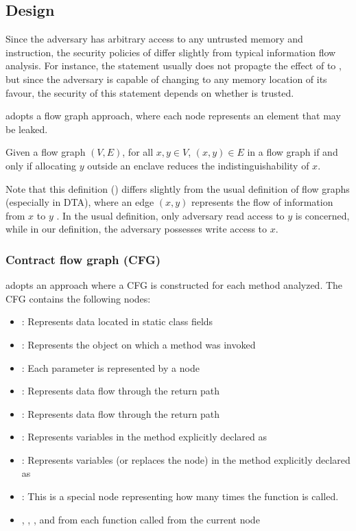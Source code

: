 \subsection{Design}
Since the adversary has arbitrary access to any untrusted memory and instruction,
the security policies of \pname{} differ slightly from typical information flow analysis.
For instance, the statement  usually
does not propagte the effect of  to ,
but since the adversary is capable of changing  to any memory location of its favour,
the security of this statement depends on whether  is trusted.

\pname{} adopts a flow graph approach,
where each node represents an element that may be leaked.

\begin{defin}
	Given a flow graph $(V, E)$, for all $x, y \in V$,
	$(x, y) \in E$ in a flow graph if and only if
	allocating $y$ outside an enclave reduces the indistinguishability of $x$.
\end{defin}

Note that this definition () differs slightly from
the usual definition of flow graphs (especially in DTA),
where an edge $(x, y)$ represents the flow of information from $x$ to $y$ \cite{YinHeng2007Pcsi}.
In the usual definition, only adversary read access to $y$ is concerned,
while in our definition, the adversary possesses write access to $x$.

\subsubsection{Contract flow graph (CFG)}
\pname{} adopts an approach where a CFG is constructed for each method analyzed.
The CFG contains the following nodes:
\begin{itemize}
	\item {}: Represents data located in static class fields
	\item {}: Represents the object on which a method was invoked
	\item {}: Each parameter is represented by a node
	\item {}: Represents data flow through the return path
	\item {}: Represents data flow through the return path
	\item {}: Represents variables in the method explicitly declared as 
	\item {}: Represents variables (or replaces the  node)
		in the method explicitly declared as 
	\item {}: This is a special node representing how many times the function is called.
	\item {}, , ,  and 
		from each function called from the current node
\end{itemize}


